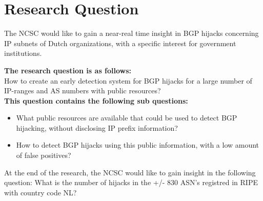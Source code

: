 \section{Research Question}

The NCSC would like to gain a near-real time insight in BGP hijacks concerning IP subnets of Dutch organizations, with a specific interest for government institutions.

\textbf{The research question is as follows:}\\
How to create an early detection system for BGP hijacks for a large number of IP-ranges and AS numbers with public resources? \\

\textbf{This question contains the following sub questions:}\\
\begin{itemize}
\item{What public resources are available that could be used to detect BGP hijacking, without disclosing IP prefix information?}
\item{How to detect BGP hijacks using this public information, with a low amount of false positives?}
\end{itemize}

At the end of the research, the NCSC would like to gain insight in the following question: What is the number of hijacks in the +/- 830 ASN's registred in RIPE with country code NL?

